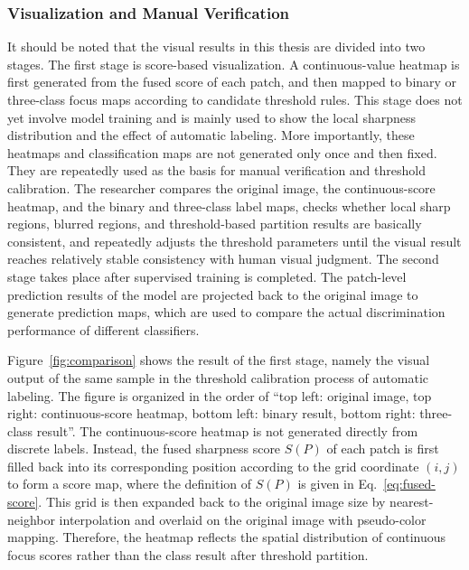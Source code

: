 \subsubsection{Visualization and Manual Verification}
\par It should be noted that the visual results in this thesis are divided into
two stages. The first stage is score-based visualization. A continuous-value
heatmap is first generated from the fused score of each patch, and then mapped
to binary or three-class focus maps according to candidate threshold rules.
This stage does not yet involve model training and is mainly used to show the
local sharpness distribution and the effect of automatic labeling. More
importantly, these heatmaps and classification maps are not generated only once
and then fixed. They are repeatedly used as the basis for manual verification
and threshold calibration. The researcher compares the original image, the
continuous-score heatmap, and the binary and three-class label maps, checks
whether local sharp regions, blurred regions, and threshold-based partition
results are basically consistent, and repeatedly adjusts the threshold
parameters until the visual result reaches relatively stable consistency with
human visual judgment. The second stage takes place after supervised training
is completed. The patch-level prediction results of the model are projected
back to the original image to generate prediction maps, which are used to
compare the actual discrimination performance of different classifiers.

\par Figure~\ref{fig:comparison} shows the result of the first stage, namely
the visual output of the same sample in the threshold calibration process of
automatic labeling. The figure is organized in the order of ``top left:
original image, top right: continuous-score heatmap, bottom left: binary
result, bottom right: three-class result''. The continuous-score heatmap is
not generated directly from discrete labels. Instead, the fused sharpness score
$S(P)$ of each patch is first filled back into its corresponding position
according to the grid coordinate $(i,j)$ to form a score map, where the
definition of $S(P)$ is given in Eq.~\eqref{eq:fused-score}. This grid is then
expanded back to the original image size by nearest-neighbor interpolation and
overlaid on the original image with pseudo-color mapping. Therefore, the
heatmap reflects the spatial distribution of continuous focus scores rather
than the class result after threshold partition.

